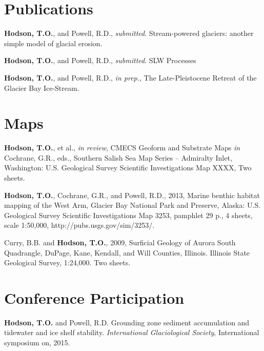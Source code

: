 \section{Publications}

\textbf{Hodson, T.O.}, and Powell, R.D., \textsl{submitted}. Stream-powered glaciers: another simple model of glacial erosion.

\textbf{Hodson, T.O.}, and Powell, R.D., \textsl{submitted}. SLW Processes 


\textbf{Hodson, T.O.}, and Powell, R.D., \textsl{in prep.}, The Late-Pleistocene Retreat of the Glacier Bay Ice-Stream.

\section{Maps}
\textbf{Hodson, T.O.}, et al., \textsl{in review}, CMECS Geoform and Substrate Maps \textsl{in} Cochrane, G.R., eds., Southern Salish Sea Map Series -- Admiralty Inlet, Washington: U.S. Geological Survey Scientific Investigations Map XXXX, Two sheets.

\textbf{Hodson, T.O.}, Cochrane, G.R., and Powell, R.D., 2013, Marine benthic habitat mapping of the West Arm, Glacier Bay National Park and Preserve, Alaska: U.S. Geological Survey Scientific Investigations Map 3253, pamphlet 29 p., 4 sheets, scale 1:50,000, http://pubs.usgs.gov/sim/3253/.

Curry, B.B. and \textbf{Hodson, T.O.}, 2009, Surficial Geology of Aurora South Quadrangle, DuPage, Kane, Kendall, and Will Counties, Illinois. Illinois State Geological Survey, 1:24,000. Two sheets.

\section{Conference Participation}

\textbf{Hodson, T.O.} and Powell, R.D. Grounding zone sediment accumulation and tidewater and ice shelf stability. 
\textsl{International Glaciological Society}, International symposium on, 2015.

